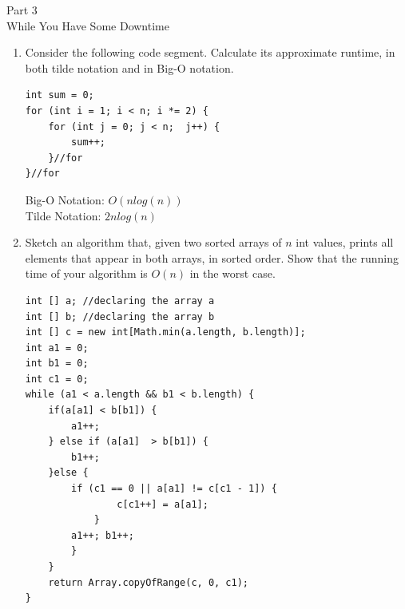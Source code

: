 \documentclass{article}
\begin{document}
\newpage
\begin{center}
\Huge Part 3
\\
\Huge While You Have Some Downtime 

\end{center}
\begin{enumerate}
\item Consider the following code segment. Calculate its approximate runtime, in both tilde notation and in Big-O notation.
\\
\begin{lstlisting}
int sum = 0;
for (int i = 1; i < n; i *= 2) {
	for (int j = 0; j < n;  j++) {
		sum++;
	}//for
}//for
\end{lstlisting}
Big-O Notation: $O(n log (n))$
\\
Tilde Notation: $2n log(n) $

\item Sketch an algorithm that, given two sorted arrays of $n$ int values, prints all elements that appear in both arrays, in sorted order. Show that the running time of your algorithm is $O(n)$ in the worst case.
\\
\begin{lstlisting}
int [] a; //declaring the array a
int [] b; //declaring the array b
int [] c = new int[Math.min(a.length, b.length)];
int a1 = 0;
int b1 = 0;
int c1 = 0;
while (a1 < a.length && b1 < b.length) {
	if(a[a1] < b[b1]) {
		a1++;
	} else if (a[a1]  > b[b1]) {
		b1++;
	}else {
		if (c1 == 0 || a[a1] != c[c1 - 1]) {
				c[c1++] = a[a1];
			}
		a1++; b1++;
		}
	}
	return Array.copyOfRange(c, 0, c1);
}


\end{lstlisting}
\end{enumerate}
\end{document}
